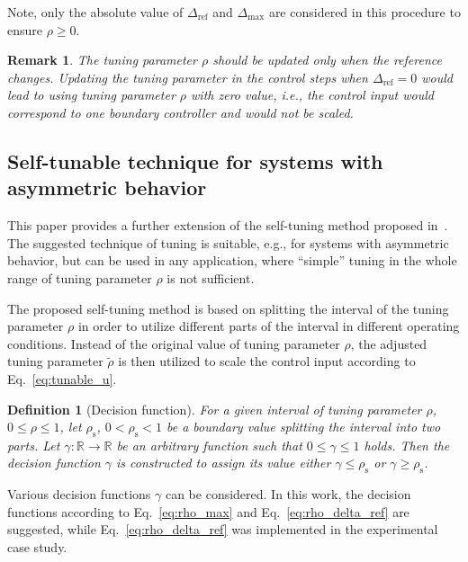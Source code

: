 \documentclass[preprint,12pt]{elsarticle}
\newtheorem{remark}[theorem]{Remark}
\newtheorem{definition}{Definition}[section]
\begin{document}
	Note, only the absolute value of $\Delta_{\mathrm{ref}}$ and $\Delta_{\max}$ are considered in this procedure to ensure $\rho \ge 0$. 
	
	\begin{remark}
		The tuning parameter $\rho$ should be updated only when the reference changes. Updating the tuning parameter in the control steps when $\Delta_{\mathrm{ref}} = 0$ would lead to using tuning parameter $\rho$ with zero value, i.e., the control input would correspond to one boundary controller and would not be scaled.
	\end{remark}
	
	
	\subsection{Self-tunable technique for systems with asymmetric behavior}
	\label{sec:self_tunable_rho_scaling}
	
	This paper provides a further extension of the self-tuning method proposed in~\cite{self_tunable}. The suggested technique of tuning is suitable, e.g., for systems with asymmetric behavior, but can be used in any application, where ``simple'' tuning in the whole range of tuning parameter $\rho$ is not sufficient.
	
	The proposed self-tuning method is based on splitting the interval of the tuning parameter $\rho$ in order to utilize different parts of the interval in different operating conditions. Instead of the original value of tuning parameter $\rho$, the adjusted tuning parameter $\widetilde{\rho}$ is then utilized to scale the control input according to Eq.~\eqref{eq:tunable_u}.
	
	\begin{definition}[Decision function]
		\label{def:gamma}
		For a given interval of tuning parameter $\rho$, $0 \leq \rho \leq 1$, let $\rho_{\mathrm{s}}$, $0 < \rho_{\mathrm{s}} < 1$ be a boundary value splitting the interval into two parts. Let $\gamma: \mathbb{R} \rightarrow \mathbb{R}$ be an arbitrary function such that $0 \leq \gamma \leq 1$ holds. Then the decision function $\gamma$ is constructed to assign its value either $\gamma \leq \rho_{\mathrm{s}}$ or $\gamma \ge \rho_{\mathrm{s}}$.
	\end{definition}
	Various decision functions $\gamma$ can be considered. In this work, the decision functions according to Eq.~\eqref{eq:rho_max} and Eq.~\eqref{eq:rho_delta_ref} are suggested, while Eq.~\eqref{eq:rho_delta_ref} was implemented in the experimental case study.
	
\end{document}
